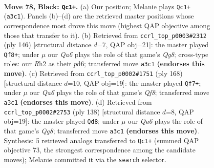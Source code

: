 \documentclass[11pt]{article}
\begin{document}
\clearpage

\begin{figure}[p]\centering
\begin{subfigure}{0.46\textwidth}\centering
\resizebox{\linewidth}{!}{%
\newchessgame
\chessboard[
  setfen={3Q4/8/5pk1/8/2K5/q5P1/7r/8 b - - 7 78},
  showmover=false,
  pgfstyle=straightmove, color=movearrow, markmove={a3-c1}
]}
\caption{}
\end{subfigure}\hfill
\begin{subfigure}{0.46\textwidth}\centering
\resizebox{\linewidth}{!}{%
\newchessgame
\chessboard[
  setfen={6Q1/8/3p1k2/7p/q7/8/1KP5/8 w - - 2 74},
  showmover=false,
  pgfstyle=straightmove, color=movearrow, markmove={g8-f8}
]}
\caption{}
\end{subfigure}
\\[4pt]
\begin{subfigure}{0.46\textwidth}\centering
\resizebox{\linewidth}{!}{%
\newchessgame
\chessboard[
  setfen={5Q2/1k6/8/1P6/8/1K6/4qp2/8 w - - 6 85},
  showmover=false,
  pgfstyle=straightmove, color=movearrow, markmove={f8-f7}
]}
\caption{}
\end{subfigure}\hfill
\begin{subfigure}{0.46\textwidth}\centering
\resizebox{\linewidth}{!}{%
\newchessgame
\chessboard[
  setfen={6Q1/8/8/5K2/p7/P7/5k2/2q5 w - - 5 70},
  showmover=false,
  pgfstyle=straightmove, color=movearrow, markmove={g8-d8}
]}
\caption{}
\end{subfigure}
\caption{\textbf{Move 78, Black: \texttt{Qc1+}.} (a) Our position; Melanie plays \texttt{Qc1+} (\texttt{a3c1}). Panels (b)--(d) are the retrieved master positions whose correspondence most drove this move (highest QAP objective among those that transfer to it). (b) Retrieved from \texttt{ccrl\_top\_p0003\#2312} (ply 146) [structural distance $d$=7, QAP obj=21]: the master played \texttt{Qf8+}; under $\mu$ our \emph{Qa6} plays the role of that game's \emph{Qg8}; cross-type roles: our \emph{R}h2 as their \emph{p}d6; transferred move \texttt{a3c1} \textbf{(endorses this move)}. (c) Retrieved from \texttt{ccrl\_top\_p0002\#1751} (ply 168) [structural distance $d$=10, QAP obj=19]: the master played \texttt{Qf7+}; under $\mu$ our \emph{Qa6} plays the role of that game's \emph{Qf8}; transferred move \texttt{a3c1} \textbf{(endorses this move)}. (d) Retrieved from \texttt{ccrl\_top\_p0002\#2753} (ply 138) [structural distance $d$=8, QAP obj=19]: the master played \texttt{Qd8}; under $\mu$ our \emph{Qa6} plays the role of that game's \emph{Qg8}; transferred move \texttt{a3c1} \textbf{(endorses this move)}. Synthesis: 5 retrieved analogs transferred to \texttt{Qc1+} (summed QAP objective 73, the strongest correspondence among the candidate moves); Melanie committed it via the \texttt{search} selector.}
\label{fig:thought-m155}
\end{figure}
\end{document}

